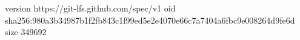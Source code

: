 version https://git-lfs.github.com/spec/v1
oid sha256:980a3b34987b1f2fb843c1f99ed5e2e4070e66c7a7404a6fbc9e008264d9fe6d
size 349692
